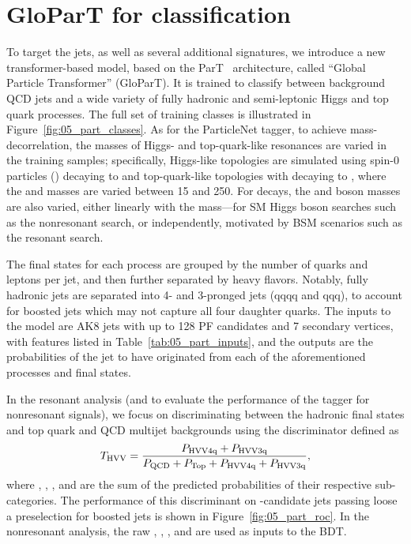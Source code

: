 \section{GloParT for \texorpdfstring{\hyvv}{H/Y→VV} classification}
\label{sec:05_hww_tagger}

To target the \hyvvq jets, as well as several additional signatures, we introduce a new transformer-based model, based on the ParT~\cite{Qu:2022mxj} architecture, called ``Global Particle Transformer'' (GloParT).
It is trained to classify between background QCD jets and a wide variety of fully hadronic and semi-leptonic Higgs and top quark processes.
The full set of training classes is illustrated in Figure~\ref{fig:05_part_classes}.
As for the ParticleNet tagger, to achieve mass-decorrelation, the masses of Higgs- and top-quark-like resonances are varied in the training samples; specifically, Higgs-like topologies are simulated using spin-0 particles (\PG) decaying to \HH and top-quark-like topologies with \PG decaying to \ttbar, where the \PH and \PQt masses are varied between 15 and 250\GeV.
For \hvv decays, the \PW and \PZ boson masses are also varied, either linearly with the \PH mass---for SM Higgs boson searches such as the nonresonant \HH search, or independently, motivated by BSM scenarios such as the resonant \XHY search.

The final states for each process are grouped by the number of quarks and leptons per jet, and then further separated by heavy flavors.
Notably, fully hadronic \hvv jets are separated into 4- and 3-pronged jets (qqqq and qqq), to account for boosted jets which may not capture all four \VV daughter quarks.
The inputs to the model are AK8 jets with up to 128 PF candidates and 7 secondary vertices, with features listed in Table~\ref{tab:05_part_inputs}, and the outputs are the probabilities of the jet to have originated from each of the aforementioned processes and final states.

In the resonant analysis (and to evaluate the performance of the tagger for nonresonant signals), we focus on discriminating between the hadronic \hvv final states and top quark and QCD multijet backgrounds using the \THWW discriminator defined as
\begin{equation}
  \label{eq:05_thww}
  T_{\mathrm{HVV}} = \frac{P_{\mathrm{HVV4q}} + P_{\mathrm{HVV3q}}}{P_{\mathrm{QCD}} + P_{\mathrm{Top}} + P_{\mathrm{HVV4q}} + P_{\mathrm{HVV3q}}},
\end{equation}
where \PHWWqqqq, \PHWWqqq, \PQCD, and \PTop are the sum of the predicted probabilities of their respective sub-categories.
The performance of this discriminant on \VV-candidate jets passing loose a preselection for boosted jets is shown in Figure~\ref{fig:05_part_roc}.
In the nonresonant analysis, the raw \PHWWqqqq, \PHWWqqq, \PQCD, and \PTop are used as inputs to the BDT.

